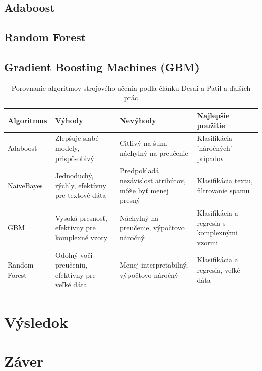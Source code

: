 \documentclass[12pt,twoside,slovak,a4paper]{article}
\begin{document}
\subsection{Adaboost\cite{7087040}}

\subsection{Random Forest\cite{9952138}}

\subsection{Gradient Boosting Machines (GBM)\cite{9952143}}




\begin{table}[h]
\centering
\begin{tabular}{|l|p{4cm}|p{4cm}|p{3cm}|}
\hline
\textbf{Algoritmus} & \textbf{Výhody} & \textbf{Nevýhody} & \textbf{Najlepšie použitie} \\
\hline
Adaboost & Zlepšuje slabé modely, prispôsobivý & Citlivý na šum, náchylný na preučenie & Klasifikácia 'náročných' prípadov \\
\hline
NaiveBayes & Jednoduchý, rýchly, efektívny pre textové dáta & Predpokladá nezávislosť atribútov, môže byť menej presný & Klasifikácia textu, filtrovanie spamu \\
\hline
GBM & Vysoká presnosť, efektívny pre komplexné vzory & Náchylný na preučenie, výpočtovo náročný & Klasifikácia a regresia s komplexnými vzormi \\
\hline
Random Forest & Odolný voči preučeniu, efektívny pre veľké dáta & Menej interpretabilný, výpočtovo náročný & Klasifikácia a regresia, veľké dáta \\
\hline
\end{tabular}
\caption{Porovnanie algoritmov strojového učenia podľa článku Desai a Patil \cite{7087040} a ďalších prác \cite{7809906,9952138,9952143}}
\label{table:algorithm_comparison}
\end{table}



\section{Výsledok}


\section{Záver} 
\end{document}
